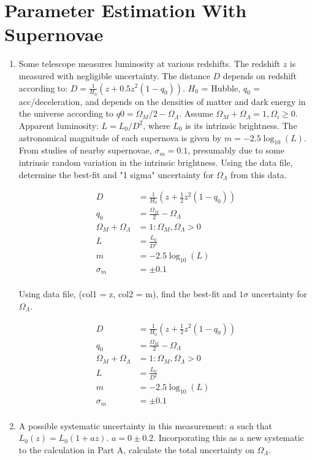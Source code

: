 \section{Parameter Estimation With Supernovae}

\begin{enumerate}[label=\textbf{\Alph*}.]
    \item Some telescope measures luminosity at various redshifts.
    The redshift $z$ is measured with negligible uncertainty.
    The distance $D$ depends on redshift according to: $D = \frac{1}{H_0}(z + 0.5z^2(1-q_0))$.
    $H_0$ = Hubble, $q_0$ = acc/deceleration, and depends on the densities of matter and dark energy in the universe according to $q0 = \Omega_M/2 - \Omega_\Lambda$.
    Assume $\Omega_M + \Omega_\Lambda = 1, \Omega_i \ge 0$.
    Apparent luminosity: $L=L_0/D^2$, where $L_0$ is its intrinsic brightness.
    The astronomical magnitude of each supernova is given by $m = -2.5\log_{10}(L)$.
    From studies of nearby supernovae, $\sigma_m = 0.1$, presumably due to some intrinsic random variation in the intrinsic brightness.
    Using the data file, determine the best-fit and "1 sigma" uncertainty for $\Omega_\Lambda$ from this data.



    \begin{align*}
        D &= \frac{1}{H_0} \left(z + \frac{1}{2}z^2 (1-q_0)\right)\\
        q_0 &= \frac{\Omega_M}{2} - \Omega_\Lambda\\
        \Omega_M + \Omega_\Lambda &= 1: \Omega_M, \Omega_\Lambda > 0\\
        L &= \frac{L_0}{D^2}\\
        m &= -2.5\log_{10}(L)\\
        \sigma_m &= \pm 0.1 \\
    \end{align*}
    
    Using data file, (col1 = z, col2 = m), find the best-fit and $1\sigma$ uncertainty for $\Omega_\Lambda$.
    
    \begin{align*}
        D &= \frac{1}{H_0} \left(z + \frac{1}{2}z^2 (1-q_0)\right)\\
        q_0 &= \frac{\Omega_M}{2} - \Omega_\Lambda\\
        \Omega_M + \Omega_\Lambda &= 1: \Omega_M, \Omega_\Lambda > 0\\
        L &= \frac{L_0}{D^2}\\
        m &= -2.5\log_{10}(L)\\
        \sigma_m &= \pm 0.1 \\
    \end{align*}


    \item A possible systematic uncertainty in this measurement: $a$ such that $L_0(z) = L_0(1+az)$.
    $a=0 \pm 0.2$. Incorporating this as a new systematic to the calculation in Part A, calculate the total uncertainty on $\Omega_\Lambda$.

\end{enumerate}

